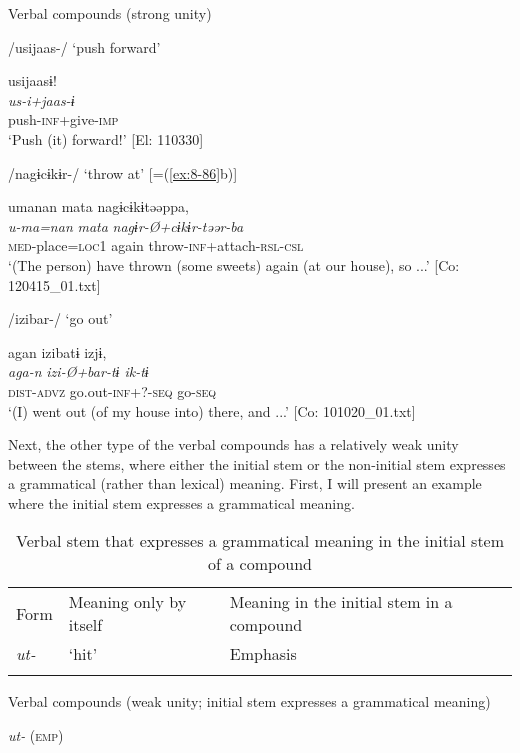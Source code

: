 \ea\label{ex:8-146}
  Verbal compounds (strong unity)

\ea /usijaas-/ ‘push forward’

{\TM}
\glll  usijaasɨ!\\
\textit{us-i+jaas-ɨ}\\
push-\textsc{inf}+give-\textsc{imp}\\
\glt ‘Push (it) forward!’ [El: 110330]


\ex /nagɨcɨkɨr-/ ‘throw at’ [=(\ref{ex:8-86}b)]

{\TM}
\glll  umanan  mata  nagɨcɨkɨtəəppa,\\
\textit{u-ma=nan}  \textit{mata}  \textit{nagɨr-Ø+cɨkɨr-təər-ba}\\
\textsc{med}-place=\textsc{loc1}  again  throw-\textsc{inf}+attach-\textsc{rsl}-\textsc{csl}\\
\glt ‘(The person) have thrown (some sweets) again (at our house), so ...’ [Co: 120415\_01.txt]

\ex /izibar-/ ‘go out’

{\TM}
\glll  agan  izibatɨ  izjɨ,\\
\textit{aga-n}  \textit{izi-Ø+bar-tɨ  ik-tɨ}\\
\textsc{dist}-\textsc{advz}  go.out-\textsc{inf}+?-\textsc{seq}  go-\textsc{seq}\\
\glt ‘(I) went out (of my house into) there, and ...’ [Co: 101020\_01.txt]
\z
\z

  Next, the other type of the verbal compounds has a relatively weak unity between the stems, where either the initial stem or the non-initial stem expresses a grammatical (rather than lexical) meaning. First, I will present an example where the initial stem expresses a grammatical meaning.

\begin{table}
\caption{\label{tab:key:86} Verbal stem that expresses a grammatical meaning in the initial stem of a compound}
\begin{tabular}{lll}
  \lsptoprule
Form    & Meaning only by itself    & Meaning in the initial stem in a compound\\
\textit{ut-} &  ‘hit’    & Emphasis\\
\lspbottomrule
\end{tabular}
\end{table}

\ea\label{ex:8-147}
  Verbal compounds (weak unity; initial stem expresses a grammatical meaning)

\ea \textit{ut-} (\textsc{emp})


